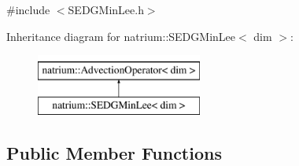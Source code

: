 {\ttfamily \#include $<$S\-E\-D\-G\-Min\-Lee.\-h$>$}

Inheritance diagram for natrium\-:\-:S\-E\-D\-G\-Min\-Lee$<$ dim $>$\-:\begin{figure}[H]
\begin{center}
\leavevmode
\includegraphics[height=2.000000cm]{classnatrium_1_1SEDGMinLee}
\end{center}
\end{figure}
\subsection*{Public Member Functions}
